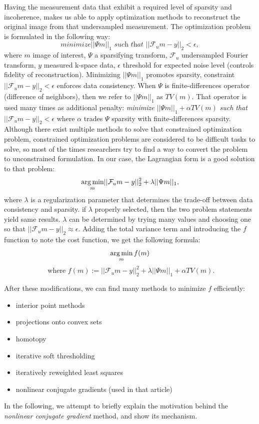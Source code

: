 Having the measurement data that exhibit a required level of sparsity and incoherence, makes us able to apply optimization methods to reconstruct the original image from that undersampled measurement. The optimization problem is formulated in the following way: $$\textit{minimize} \lvert\lvert \Psi m \rvert\rvert_1 \textit{ such that } \lvert\lvert \mathcal{F}_u m - y \rvert\rvert_2 < \epsilon,$$
where $m$ image of interest, $\Psi$ a sparsifying transform, $\mathcal{F}_u$ undersampled Fourier transform, $y$ measured k-space data, $\epsilon$ threshold for expected noise level (controls fidelity of reconstruction). Minimizing $\lvert\lvert \Psi m \rvert\rvert_1$ promotes sparsity, constraint $\lvert\lvert \mathcal{F}_u m - y \rvert\rvert_2 < \epsilon$ enforces data consistency. When $\Psi$ is finite-differences operator (difference of neighbors), then we refer to $\lvert\lvert \Psi m \rvert\rvert_1$ as $TV(m)$. That operator is used many times as additional penalty: \textit{minimize} $\lvert\lvert \Psi m \rvert\rvert_1 + \alpha TV(m)$ \textit{such that} $\lvert\lvert \mathcal{F}_u m - y \rvert\rvert_2 < \epsilon$ where $\alpha$ trades $\Psi$ sparsity with finite-differences sparsity. Although there exist multiple methods to solve that constrained optimization problem, constrained optimization problems are considered to be difficult tasks to solve, so most of the times researchers try to find a way to convert the problem to unconstrained formulation. In our case, the Lagrangian form is a good solution to that problem:
$$\operatorname*{arg\,min}_m \lvert\lvert\mathcal{F}_u m - y \rvert\rvert_2^2 + \lambda \lvert\lvert\Psi m \rvert\rvert_1,$$
where $\lambda$ is a regularization parameter that determines the trade-off between data consistency and sparsity. if $\lambda$ properly selected, then the two problem statements yield same results. $\lambda$ can be determined by trying many values and choosing one so that $\lvert\lvert\mathcal{F}_u m - y \rvert\rvert_2 \approx \epsilon$. Adding the total variance term and introducing the $f$ function to note the cost function, we get the following formula:
$$\operatorname*{arg\,min}_m f(m)$$
$$\text{ where } f(m) := \lvert\lvert\mathcal{F}_u m - y \rvert\rvert_2^2 + \lambda \lvert\lvert\Psi m \rvert\rvert_1 + \alpha TV(m).$$

After these modifications, we can find many methods to minimize $f$ efficiently:
\begin{itemize}
    \item interior point methods
    \item projections onto convex sets
    \item homotopy
    \item iterative soft thresholding
    \item iteratively reweighted least squares
    \item nonlinear conjugate gradients (used in that article)
\end{itemize}
In the following, we attempt to briefly explain the motivation behind the \textit{nonlinear conjugate gradient} method, and show its mechanism.

